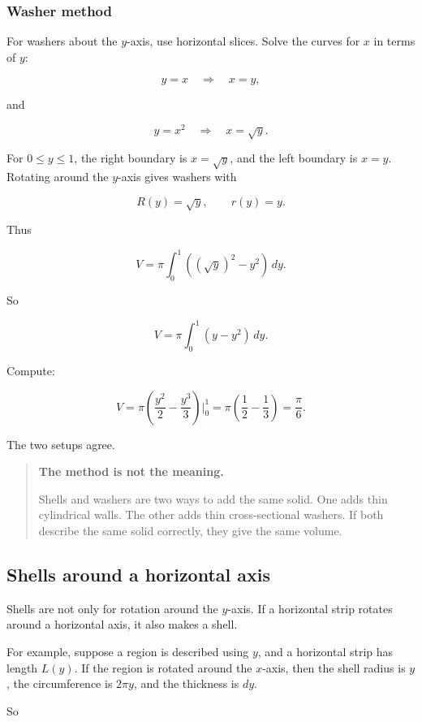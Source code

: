 \subsubsection*{Washer method}

For washers about the \(y\)-axis, use horizontal slices.  Solve the curves for \(x\)
in terms of \(y\):

\[
y=x
\quad\Longrightarrow\quad
x=y,
\]

and

\[
y=x^2
\quad\Longrightarrow\quad
x=\sqrt y.
\]

For \(0\le y\le1\), the right boundary is \(x=\sqrt y\), and the left boundary is
\(x=y\).  Rotating around the \(y\)-axis gives washers with

\[
R(y)=\sqrt y,
\qquad
r(y)=y.
\]

Thus

\[
V=\pi\int_0^1\left((\sqrt y)^2-y^2\right)\,dy.
\]

So

\[
V=\pi\int_0^1 (y-y^2)\,dy.
\]

Compute:

\[
V
=
\pi\left(\frac{y^2}{2}-\frac{y^3}{3}\right)\Big|_0^1
=
\pi\left(\frac12-\frac13\right)
=
\boxed{\frac{\pi}{6}}.
\]

The two setups agree.

\begin{quote}
\textbf{The method is not the meaning.}

Shells and washers are two ways to add the same solid.  One adds thin cylindrical
walls.  The other adds thin cross-sectional washers.  If both describe the same solid
correctly, they give the same volume.
\end{quote}

\subsection{Shells around a horizontal axis}
\label{subsec:shells-horizontal-axis}

Shells are not only for rotation around the \(y\)-axis.  If a horizontal strip rotates
around a horizontal axis, it also makes a shell.

For example, suppose a region is described using \(y\), and a horizontal strip has
length \(L(y)\).  If the region is rotated around the \(x\)-axis, then the shell radius is
\(y\), the circumference is \(2\pi y\), and the thickness is \(dy\).

So

